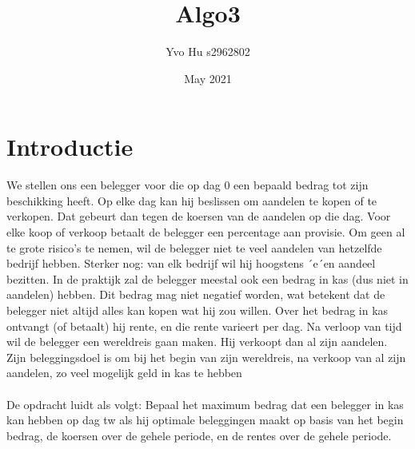 \documentclass{article}
\title{Algo3}
\author{Yvo Hu s2962802 }
\date{May 2021}
\begin{document}
\section{Introductie}
We stellen ons een belegger voor die op dag 0 een bepaald bedrag tot zijn beschikking heeft. Op
elke dag kan hij beslissen om aandelen te kopen of te verkopen. Dat gebeurt dan tegen de koersen
van de aandelen op die dag. Voor elke koop of verkoop betaalt de belegger een percentage aan
provisie. Om geen al te grote risico’s te nemen, wil de belegger niet te veel aandelen van hetzelfde
bedrijf hebben. Sterker nog: van elk bedrijf wil hij hoogstens ´e´en aandeel bezitten.
In de praktijk zal de belegger meestal ook een bedrag in kas (dus niet in aandelen) hebben. Dit
bedrag mag niet negatief worden, wat betekent dat de belegger niet altijd alles kan kopen wat
hij zou willen. Over het bedrag in kas ontvangt (of betaalt) hij rente, en die rente varieert per
dag. Na verloop van tijd wil de belegger een wereldreis gaan maken. Hij verkoopt dan al zijn
aandelen. Zijn beleggingsdoel is om bij het begin van zijn wereldreis, na verkoop van al zijn
aandelen, zo veel mogelijk geld in kas te hebben\\\\
De opdracht luidt als volgt: Bepaal het maximum bedrag dat een belegger in kas kan hebben op dag tw als hij optimale beleggingen maakt op basis van het begin bedrag, de koersen over de gehele periode, en de rentes over de gehele periode.
\end{document}
